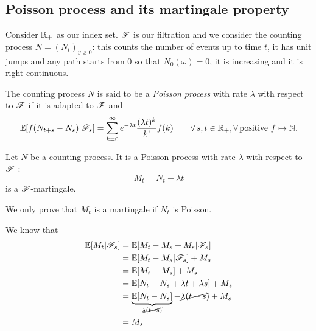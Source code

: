 \documentclass{report}
\begin{document}
\subsection{Poisson process and its martingale property}
Consider $\mathbb{R}_+$ as our index set. $\mathscr{F}$ is our filtration and we consider the counting process $N={(N_{t})}_{y\geq0}$: this counts the number of events up to time $t$, it has unit jumps and any path starts from 0 so that $N_{0}(\omega)=0$, it is increasing and it is right continuous.
\begin{definition}
	The counting process $N$ is said to be a \emph{Poisson process} with rate $\lambda$ with respect to $\mathscr{F}$ if it is adapted to $\mathscr{F}$ and
	\[\mathbb{E}[f(N_{t+s}-N_s)|\mathscr{F}_s]=\sum_{k=0}^{\infty}e^{-\lambda t}\frac{(\lambda t)^{k}}{k!}f(k)\qquad\forall\, s,t\in\mathbb{R}_+,\forall\,\text{positive }f\mapsto\mathbb{N}.\]
\end{definition}
\begin{theorem}
	Let $N$ be a counting process. It is a Poisson process with rate $\lambda$ with respect to $\mathscr{F}$ \ifonly{}:
	\begin{equation*}
		M_{t}=N_{t}-\lambda t
	\end{equation*}
	is a $\mathscr{F}$-martingale.
\end{theorem}
We only prove that $M_t$ is a martingale if $N_{t}$ is Poisson.
\begin{fancyproof}
	We know that 
	\begin{align*}
		\mathbb{E}[M_{t}|\mathscr{F}_{s}]&=\mathbb{E}[M_{t}-M_{s}+M_{s}|\mathscr{F}_{s}]\\
		&=\mathbb{E}[M_{t}-M_{s}|\mathscr{F}_{s}]+M_{s}\\
		&=\mathbb{E}[M_{t}-M_{s}]+M_{s}\\
		&=\mathbb{E}[N_{t}-N_{s}+\lambda t+\lambda s]+M_{s}\\
		&=\underbrace{\mathbb{E}[N_{t}-N_{s}]}_{\cancel{\lambda (t-s)}}-\cancel{\lambda (t-s)}+M_{s}\\
		&=M_{s}
	\end{align*}
\end{fancyproof}
\end{document}
